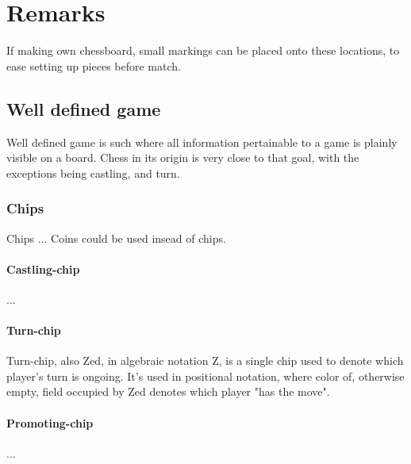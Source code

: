 

\chapter*{Remarks}
\label{ch:Remarks}

If making own chessboard, small markings can be placed onto these locations, to ease setting
up pieces before match.

\section*{Well defined game}
\label{sec:Remarks/Well defined game}

Well defined game is such where all information pertainable to a game
is plainly visible on a board. Chess in its origin is very close to
that goal, with the exceptions being castling, and turn.

\subsection*{Chips}
\label{sec:Remarks/Chips}
Chips ...
Coins could be used insead of chips.

\subsubsection*{Castling-chip}
\label{sec:Remarks/Chips/Castling-chip}
...

\subsubsection*{Turn-chip}
\label{sec:Remarks/Chips/Turn-chip}
Turn-chip, also Zed, in algebraic notation Z, is a single chip used to
denote which player's turn is ongoing. It's used in positional notation,
where color of, otherwise empty, field occupied by Zed denotes which
player "has the move".

\subsubsection*{Promoting-chip}
\label{sec:Remarks/Chips/Promoting-chip}
...

